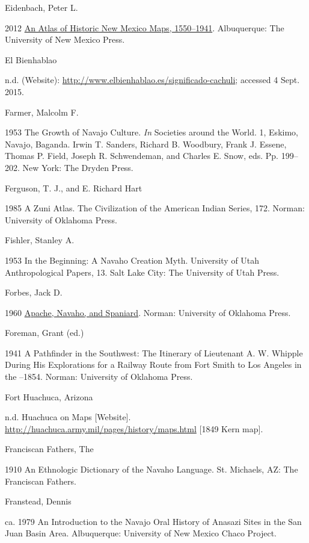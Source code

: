 Eidenbach, Peter L.  

2012  \href{http://melvyl.worldcat.org/title/atlas-of-historic-new-mexico-maps-1550-1941/oclc/794816498 & referer=brief_results}{An Atlas of Historic New Mexico Maps, 1550–1941}.  Albuquerque:  The University of New Mexico Press.

El Bienhablao 

n.d.  (Website): \url{http://www.elbienhablao.es/significado-cachuli}; accessed 4 Sept. 2015.

Farmer, Malcolm F.  

1953  The Growth of Navajo Culture.  \textit{In} Societies around the World.  1, Eskimo, Navajo, Baganda.  Irwin T. Sanders, Richard B. Woodbury, Frank J. Essene, Thomas P. Field, Joseph R. Schwendeman, and Charles E. Snow, eds.  Pp. 199–202.  New York:  The Dryden Press.

Ferguson, T. J., and E. Richard Hart

1985  A Zuni Atlas.  The Civilization of the American Indian Series, 172.  Norman:  University of Oklahoma Press.

Fishler, Stanley A.  

1953  In the Beginning: A Navaho Creation Myth.  University of Utah Anthropological Papers, 13.  Salt Lake City:  The University of Utah Press.

Forbes, Jack D.

1960  \href{http://melvyl.worldcat.org/title/apache-navaho-and-spaniard/oclc/244951 & referer=brief_results}{Apache, Navaho, and Spaniard}.  Norman:  University of Oklahoma Press.

Foreman, Grant (ed.)  

1941  A Pathfinder in the Southwest: The Itinerary of Lieutenant A. W. Whipple During His Explorations for a Railway Route from Fort Smith to Los Angeles in the \citealt{Years1853}–1854.  Norman:  University of Oklahoma Press.

Fort Huachuca, Arizona

n.d.  Huachuca on Maps [Website]. \url{http://huachuca.army.mil/pages/history/maps.html} [1849 Kern map].

Franciscan Fathers, The

1910  An Ethnologic Dictionary of the Navaho Language.  St. Michaels, AZ:  The Franciscan Fathers.

Franstead, Dennis

ca. 1979  An Introduction to the Navajo Oral History of Anasazi Sites in the San Juan Basin Area.  Albuquerque:  University of New Mexico Chaco Project.

